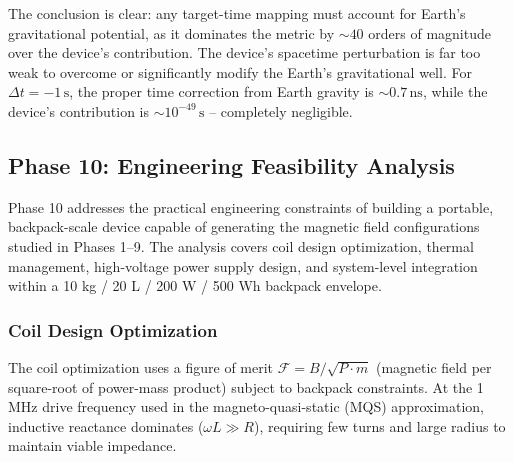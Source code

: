 The conclusion is clear: any target-time mapping must account for Earth's gravitational potential, as it dominates the metric by $\sim 40$ orders of magnitude over the device's contribution. The device's spacetime perturbation is far too weak to overcome or significantly modify the Earth's gravitational well. For $\Delta t = -1\,\text{s}$, the proper time correction from Earth gravity is $\sim 0.7\,\text{ns}$, while the device's contribution is $\sim 10^{-49}\,\text{s}$ -- completely negligible.

\subsection{Phase 10: Engineering Feasibility Analysis}
\label{sec:phase10-engineering}

Phase 10 addresses the practical engineering constraints of building a portable, backpack-scale device capable of generating the magnetic field configurations studied in Phases 1--9. The analysis covers coil design optimization, thermal management, high-voltage power supply design, and system-level integration within a 10 kg / 20 L / 200 W / 500 Wh backpack envelope.

\subsubsection{Coil Design Optimization}

The coil optimization uses a figure of merit $\mathcal{F} = B / \sqrt{P \cdot m}$ (magnetic field per square-root of power-mass product) subject to backpack constraints. At the 1 MHz drive frequency used in the magneto-quasi-static (MQS) approximation, inductive reactance dominates ($\omega L \gg R$), requiring few turns and large radius to maintain viable impedance.

